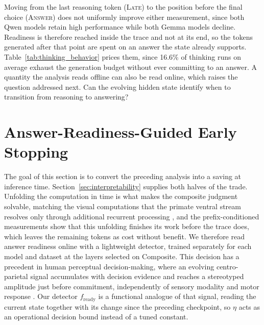 \documentclass{article} %
\begin{document}
Moving from the last reasoning token (\textsc{Late}) to the position before the final choice (\textsc{Answer}) does not uniformly improve either measurement, since both Qwen models retain high performance while both Gemma models decline. Readiness is therefore reached inside the trace and not at its end, so the tokens generated after that point are spent on an answer the state already supports. Table~\ref{tab:thinking_behavior} prices them, since 16.6\% of thinking runs on average exhaust the generation budget without ever committing to an answer. A quantity the analysis reads offline can also be read online, which raises the question addressed next. Can the evolving hidden state identify when to transition from reasoning to answering?

\section{Answer-Readiness-Guided Early Stopping}
\label{sec:early_stopping}

The goal of this section is to convert the preceding analysis into a saving at inference time. Section~\ref{sec:interpretability} supplies both halves of the trade. Unfolding the computation in time is what makes the composite judgment solvable, matching the visual computations that the primate ventral stream resolves only through additional recurrent processing \citep{lamme2000distinct,kar2019evidence}, and the prefix-conditioned measurements show that this unfolding finishes its work before the trace does, which leaves the remaining tokens as cost without benefit. We therefore read answer readiness online with a lightweight detector, trained separately for each model and dataset at the layers selected on Composite. This decision has a precedent in human perceptual decision-making, where an evolving centro-parietal signal accumulates with decision evidence and reaches a stereotyped amplitude just before commitment, independently of sensory modality and motor response \citep{oconnell2012supramodal}. Our detector $f_{\mathrm{ready}}$ is a functional analogue of that signal, reading the current state together with its change since the preceding checkpoint, so $\eta$ acts as an operational decision bound instead of a tuned constant.
\end{document}
